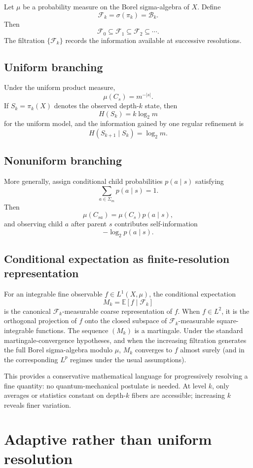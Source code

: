 \documentclass[11pt]{article}
\theoremstyle{definition}
\theoremstyle{remark}
\newcommand{\B}{\mathcal B}
\newcommand{\F}{\mathcal F}
\newcommand{\cyl}[1]{C_{#1}}
\begin{document}
Let $\mu$ be a probability measure on the Borel sigma-algebra of $X$.  Define
\[
\F_k=\sigma(\pi_k)=\B_k.
\]
Then
\[
\F_0\subseteq\F_1\subseteq\F_2\subseteq\cdots.
\]
The filtration $\{\F_k\}$ records the information available at successive resolutions.

\subsection{Uniform branching}

Under the uniform product measure,
\[
\mu(\cyl{s})=m^{-|s|}.
\]
If $S_k=\pi_k(X)$ denotes the observed depth-$k$ state, then
\[
H(S_k)=k\log_2m
\]
for the uniform model, and the information gained by one regular refinement is
\[
H(S_{k+1}\mid S_k)=\log_2m.
\]

\subsection{Nonuniform branching}

More generally, assign conditional child probabilities $p(a\mid s)$ satisfying
\[
\sum_{a\in\Sigma_m}p(a\mid s)=1.
\]
Then
\[
\mu(\cyl{sa})=\mu(\cyl{s})p(a\mid s),
\]
and observing child $a$ after parent $s$ contributes self-information
\[
-\log_2p(a\mid s).
\]

\subsection{Conditional expectation as finite-resolution representation}

For an integrable fine observable $f\in L^1(X,\mu)$, the conditional expectation
\[
M_k=\mathbb E[f\mid\F_k]
\]
is the canonical $\F_k$-measurable coarse representation of $f$.  When $f\in L^2$, it is the orthogonal projection of $f$ onto the closed subspace of $\F_k$-measurable square-integrable functions.  The sequence $(M_k)$ is a martingale.  Under the standard martingale-convergence hypotheses, and when the increasing filtration generates the full Borel sigma-algebra modulo $\mu$, $M_k$ converges to $f$ almost surely (and in the corresponding $L^p$ regimes under the usual assumptions).

This provides a conservative mathematical language for progressively resolving a fine quantity: no quantum-mechanical postulate is needed.  At level $k$, only averages or statistics constant on depth-$k$ fibers are accessible; increasing $k$ reveals finer variation.

\section{Adaptive rather than uniform resolution}
\end{document}
